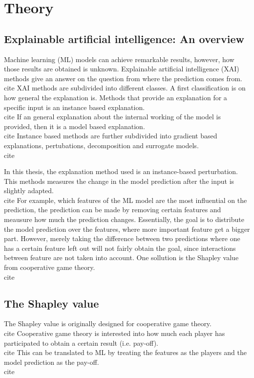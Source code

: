 \documentclass[twoside,twocolumn,9pt]{article}
\begin{document}
\section{Theory}

\subsection{Explainable artificial intelligence: An overview}

Machine learning (ML) models can achieve remarkable results, however, how 
those results are obtained is unknown. Explainable artificial intelligence 
(XAI) methods give an answer on the question from where the prediction comes 
from.\\cite{} XAI methods are subdivided into different classes. A first 
classification is on how general the explanation is. Methods that provide an 
explanation for a specific input is an instance based explanation.\\cite{}
If an general explanation about the internal working of the model is provided, 
then it is a model based explanation.\\cite{} Instance based methods are 
further subdivided into gradient based explanations, pertubations, decomposition 
and surrogate models.\\cite{} 

In this thesis, the explanation method used is an instance-based perturbation. 
This methods measures the change in the model prediction after the input is slightly 
adapted.\\cite{} For example, which features of the ML model are the most influential 
on the prediction, the prediction can be made by removing certain features and meausure 
how much the prediction changes. Essentially, the goal is to distribute the model prediction 
over the features, where more important feature get a bigger part. However, merely taking
the difference between two predictions where one has a certain feature left out will not 
fairly obtain the goal, since interactions between feature are not taken into account. 
One sollution is the Shapley value from cooperative game theory.\\cite{}

\subsection{The Shapley value}

The Shapley value is originally designed for cooperative game theory.\\cite{} Cooperative 
game theory is interested into how much each player has participated to obtain a certain 
result (i.e. pay-off).\\cite{} This can be translated to ML by treating the features as the players 
and the model prediction as the pay-off.\\cite{} 
\end{document}
